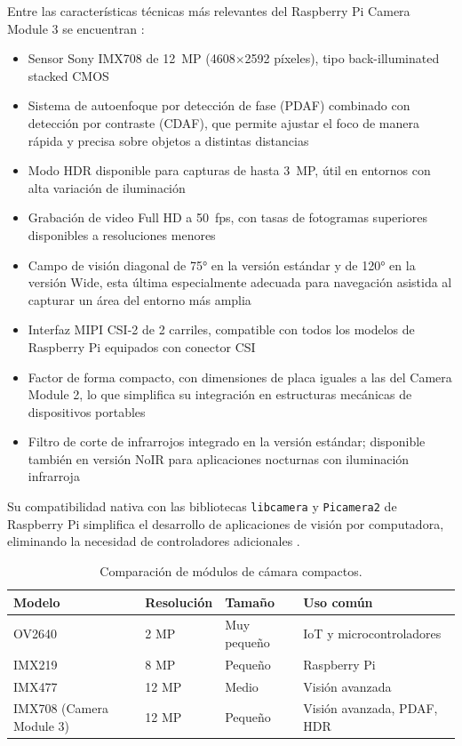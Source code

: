 Entre las características técnicas más relevantes del Raspberry Pi Camera Module 3 se encuentran \cite{raspberrypi_camera_doc}:

\begin{itemize}
\item Sensor Sony IMX708 de 12~MP (4608$\times$2592 píxeles), tipo back-illuminated stacked CMOS
\item Sistema de autoenfoque por detección de fase (PDAF) combinado con detección por contraste (CDAF), que permite ajustar el foco de manera rápida y precisa sobre objetos a distintas distancias
\item Modo HDR disponible para capturas de hasta 3~MP, útil en entornos con alta variación de iluminación
\item Grabación de video Full HD a 50~fps, con tasas de fotogramas superiores disponibles a resoluciones menores
\item Campo de visión diagonal de 75° en la versión estándar y de 120° en la versión Wide, esta última especialmente adecuada para navegación asistida al capturar un área del entorno más amplia
\item Interfaz MIPI CSI-2 de 2 carriles, compatible con todos los modelos de Raspberry Pi equipados con conector CSI
\item Factor de forma compacto, con dimensiones de placa iguales a las del Camera Module 2, lo que simplifica su integración en estructuras mecánicas de dispositivos portables
\item Filtro de corte de infrarrojos integrado en la versión estándar; disponible también en versión NoIR para aplicaciones nocturnas con iluminación infrarroja
\end{itemize}

Su compatibilidad nativa con las bibliotecas \texttt{libcamera} y \texttt{Picamera2} de Raspberry Pi simplifica el desarrollo de aplicaciones de visión por computadora, eliminando la necesidad de controladores adicionales \cite{raspberrypi_camera_doc}.

\begin{table}[H]
\centering
\begin{tabular}{llll}
\hline
Modelo & Resolución & Tamaño & Uso común \\
\hline
OV2640 \cite{ov2640_datasheet} & 2 MP & Muy pequeño & IoT y microcontroladores \\
IMX219 \cite{arducam_imx219}  & 8 MP & Pequeño & Raspberry Pi \\
IMX477 \cite{raspberrypi_camera_doc} & 12 MP & Medio & Visión avanzada \\
IMX708 (Camera Module 3) \cite{raspberrypi_camera_doc} & 12 MP & Pequeño & Visión avanzada, PDAF, HDR \\
\hline
\end{tabular}
\caption{Comparación de módulos de cámara compactos.}
\end{table}

